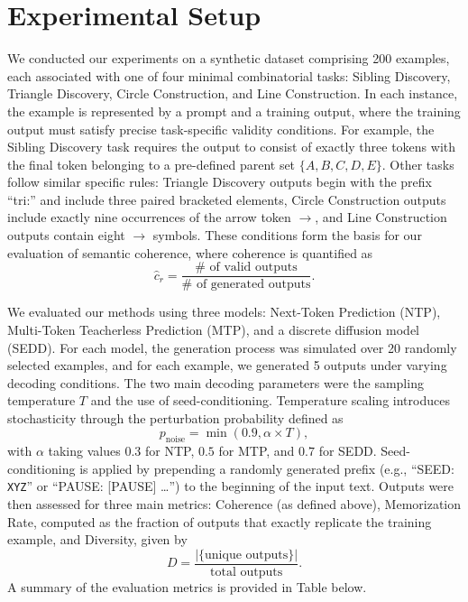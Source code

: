\documentclass{article} %
\begin{document}
\section{Experimental Setup}
We conducted our experiments on a synthetic dataset comprising 200 examples, each associated with one of four minimal combinatorial tasks: Sibling Discovery, Triangle Discovery, Circle Construction, and Line Construction. In each instance, the example is represented by a prompt and a training output, where the training output must satisfy precise task-specific validity conditions. For example, the Sibling Discovery task requires the output to consist of exactly three tokens with the final token belonging to a pre-defined parent set \( \{A, B, C, D, E\} \). Other tasks follow similar specific rules: Triangle Discovery outputs begin with the prefix “tri:” and include three paired bracketed elements, Circle Construction outputs include exactly nine occurrences of the arrow token \( \rightarrow \), and Line Construction outputs contain eight \( \rightarrow \) symbols. These conditions form the basis for our evaluation of semantic coherence, where coherence is quantified as 
\[
\hat{c}_r = \frac{\# \text{ of valid outputs}}{\# \text{ of generated outputs}}.
\]

We evaluated our methods using three models: Next-Token Prediction (NTP), Multi-Token Teacherless Prediction (MTP), and a discrete diffusion model (SEDD). For each model, the generation process was simulated over 20 randomly selected examples, and for each example, we generated 5 outputs under varying decoding conditions. The two main decoding parameters were the sampling temperature \( T \) and the use of seed-conditioning. Temperature scaling introduces stochasticity through the perturbation probability defined as
\[
p_{\text{noise}} = \min(0.9, \alpha \times T),
\]
with \(\alpha\) taking values \(0.3\) for NTP, \(0.5\) for MTP, and \(0.7\) for SEDD. Seed-conditioning is applied by prepending a randomly generated prefix (e.g., “SEED: \texttt{XYZ}” or “PAUSE: [PAUSE] …”) to the beginning of the input text. Outputs were then assessed for three main metrics: Coherence (as defined above), Memorization Rate, computed as the fraction of outputs that exactly replicate the training example, and Diversity, given by 
\[
D = \frac{|\{ \text{unique outputs} \}|}{\text{total outputs}}.
\]
A summary of the evaluation metrics is provided in Table below.
\end{document}
